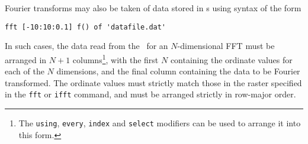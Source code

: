Fourier transforms may also be taken of data stored in \datafile s using syntax
of the form
\begin{verbatim}
fft [-10:10:0.1] f() of 'datafile.dat'
\end{verbatim}

\noindent In such cases, the data read from the \datafile\ for an
$N$-dimensional FFT must be arranged in $N+1$ columns\footnote{The {\tt using},
{\tt every}, {\tt index} and {\tt select} modifiers can be used to arrange it
into this form.}, with the first $N$ containing the ordinate values for each of
the $N$ dimensions, and the final column containing the data to be Fourier
transformed. The ordinate values must strictly match those in the raster
specified in the {\tt fft} or {\tt ifft} command, and must be arranged strictly
in row-major order.

